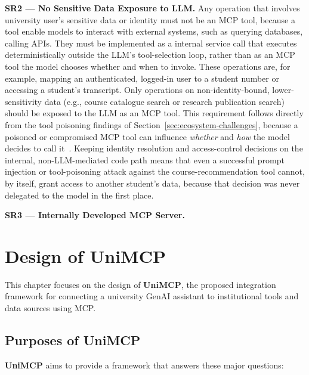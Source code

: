 \documentclass[english, 12pt, a4paper, elec, utf8, a-2b, online]{aaltothesis}
\newcommand{\UniMCP}{\textbf{UniMCP}\xspace}
\begin{document}
\textbf{SR2 ---  No Sensitive Data Exposure to LLM.}
\label{sec: SR2}
Any operation that involves university user's sensitive data or identity must not be an MCP tool, because a tool enable models to interact with external systems, such as querying databases, calling APIs. 
They must be implemented as a internal service call that executes deterministically outside the LLM's tool-selection loop, rather than as an MCP tool the model chooses whether and when to invoke. 
These operations are, for example, mapping an authenticated, logged-in user to a student number or accessing a student's transcript.
Only operations on non-identity-bound, lower-sensitivity data (e.g., course catalogue search or research publication search) should be exposed to the LLM as an MCP tool.
This requirement follows directly from the tool poisoning findings of Section~\ref{sec:ecosystem-challenges}, because a poisoned or compromised MCP tool can influence \emph{whether} and
\emph{how} the model decides to call it~\cite{wang2026mcptox}. Keeping identity resolution and
access-control decisions on the internal, non-LLM-mediated code path means that even a successful
prompt injection or tool-poisoning attack against the course-recommendation tool cannot, by itself,
grant access to another student's data, because that decision was never delegated to the model in
the first place.


\textbf{SR3 --- Internally Developed MCP Server.} 


\clearpage
\section{Design of \UniMCP}
\label{chap:design}
This chapter focuses on the design of \UniMCP, the proposed integration framework for connecting a university GenAI assistant to institutional tools and data sources using MCP. 

\subsection{Purposes of \UniMCP}
\UniMCP aims to provide a framework that answers these major questions:
\end{document}
